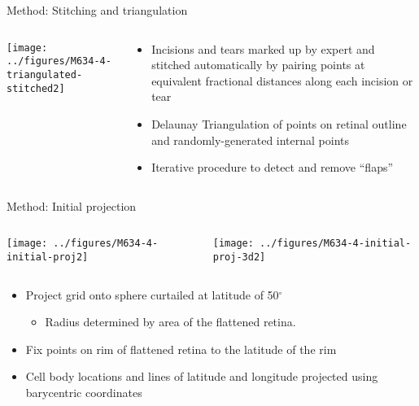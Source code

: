 \documentclass[final,hyperref={pdfpagelabels=false}]{beamer}
\begin{document}
\begin{frame}{}
\begin{columns}[T]
\begin{column}{.33\linewidth}
      \begin{block}{Method: Stitching and triangulation}
        \begin{columns}
          \begin{column}{0.35\linewidth}
            \texttt{[image: ../figures/M634-4-triangulated-stitched2]}            
          \end{column}
          \begin{column}{0.6\linewidth}
            \begin{itemize}
            \item Incisions and tears marked up by expert and stitched
              automatically by pairing points at equivalent fractional
              distances along each incision or tear
            \item Delaunay Triangulation of points on retinal outline and
              randomly-generated internal points
            \item Iterative procedure to detect and remove ``flaps''
            \end{itemize}
          \end{column}
        \end{columns}
      \end{block}


      \begin{block}{Method: Initial projection}
        \begin{columns}
          \begin{column}{0.35\linewidth}
            \texttt{[image: ../figures/M634-4-initial-proj2]}
          \end{column}
          \begin{column}{0.5\linewidth}
            \texttt{[image: ../figures/M634-4-initial-proj-3d2]}  

          \end{column}
        \end{columns}
            \begin{itemize}
            \item Project grid onto sphere curtailed at latitude of 50$^\circ$
              \begin{itemize}
              \item Radius determined by area of the flattened retina.
              \end{itemize}
            \item Fix points on rim of flattened retina to the
              latitude of the rim 
            \item Cell body locations and lines of latitude and
              longitude projected using barycentric coordinates
            \end{itemize}


\end{block}
\end{column}
\end{columns}
\end{frame}
\end{document}
